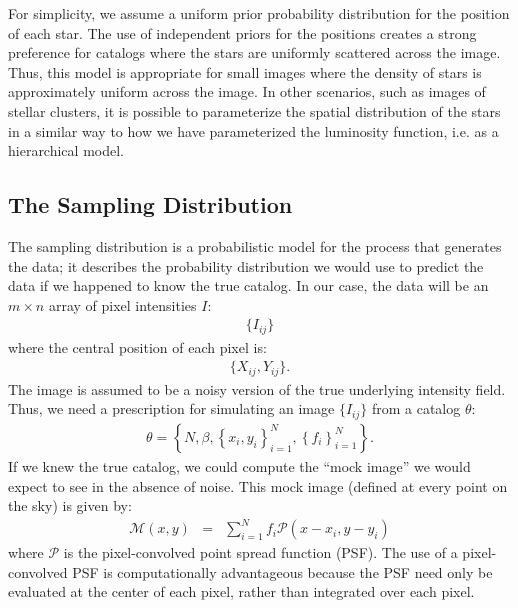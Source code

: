 \documentclass[12pt, preprint]{aastex}
\begin{document}
For simplicity, we assume a uniform prior probability distribution for the
position of each star. The use of independent priors for the positions creates
a strong preference for catalogs where
the stars are uniformly scattered across the image. Thus, this model is
appropriate for small images where the density of stars is approximately
uniform across the image. In other scenarios, such as images of stellar clusters, it is possible
to parameterize the spatial distribution of the stars in a similar way to how
we have parameterized the luminosity function, i.e. as a hierarchical model.

\subsection{The Sampling Distribution}
The sampling distribution is a probabilistic model for the process that
generates the data; it describes the probability distribution we would use
to predict the data if we happened to know the true catalog. In our case,
the data will be an $m \times n$ array of pixel intensities $I$:
\begin{eqnarray}
\{I_{ij}\}
\end{eqnarray}
where the central position of each pixel is:
\begin{eqnarray}
\{X_{ij}, Y_{ij}\}.
\end{eqnarray}
The image is assumed to be a noisy version of the true underlying intensity
field. Thus, we need
a prescription for simulating an image $\{I_{ij}\}$ from a catalog $\theta$:
\begin{eqnarray}
\theta = \left\{N, \beta, \left\{x_i, y_i\right\}_{i=1}^N,
\left\{f_i\right\}_{i=1}^N\right\}.
\end{eqnarray}
If we knew the true catalog, we could compute the
``mock image'' we would expect to see
in the absence of noise. This mock image (defined at every point on the sky)
is given by:
\begin{eqnarray}
\mathcal{M}(x, y) &=& \sum_{i=1}^N f_i \mathcal{P}(x - x_i, y - y_i)
\end{eqnarray}
where $\mathcal{P}$ is the pixel-convolved point spread function (PSF). The use
of a pixel-convolved PSF is computationally advantageous because the PSF need
only be evaluated at the center of each pixel, rather than integrated over each
pixel.
\end{document}
